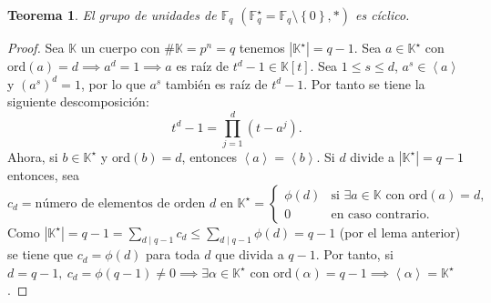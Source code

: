 \documentclass[10pt, spanish]{report}
\newtheorem*{tma}{Teorema}
\theoremstyle{definition}
\newcommand{\F}{\mathbb{F}}
\newcommand{\K}{\mathbb{K}}
\newcommand{\ord}[1]{\text{ord}(#1)}
\renewcommand{\leq}{\leqslant}
\begin{document}
\begin{tma}
    El grupo de unidades de $\F_q$ $\left( \F_q^\star=\F_q\setminus\left\{ 0
    \right\},*\right)$ es cíclico.
\end{tma}

\begin{proof}
    Sea $\K$ un cuerpo con $\#\K=p^n=q$ tenemos $\left|\K^\star\right|=q-1$. Sea
    $a\in\K^\star$ con $\ord{a}=d \implies a^d=1 \implies a$ es raíz de
    $t^d-1\in\K[t]$. Sea $1\leq s\leq d$, $a^s\in\left<a\right>$ y $(a^s)^d=1$,
    por lo que $a^s$ también es raíz de $t^d-1$. Por tanto se tiene la siguiente
    descomposición: \[t^d-1=\prod_{j=1}^{d}(t-a^j).\]
    Ahora, si $b\in\K^\star$ y $\ord{b}=d$, entonces $\left<a\right> = \left<b
    \right>$. Si $d$ divide a $\left| \K^\star \right| = q-1$ entonces, sea
    \[c_d=\text{número de elementos de orden }d\text{ en }\K^\star=
        \begin{cases}
            \phi(d)&\text{si }\exists a\in\K \text{ con }\ord{a}=d,\\
            0&\text{en caso contrario}.
        \end{cases}\]
        Como $\left|\K^\star\right|=q-1=\sum_{d\mid q-1} c_d\leq \sum_{d\mid
        q-1}\phi(d)=q-1$ (por el lema anterior) se tiene que $c_d=\phi(d)$ para
        toda $d$ que divida a $q-1$. Por tanto, si $d=q-1,\ c_d=\phi(q-1)\neq0
        \implies\exists\alpha\in\K^\star$ con $\ord{\alpha}=q-1\implies
        \left<\alpha\right>=\K^\star$.
\end{proof}
\end{document}
